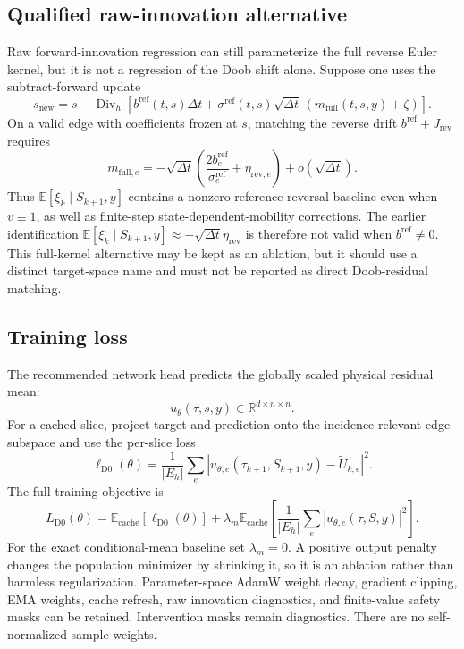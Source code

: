 \documentclass[11pt]{article}
\numberwithin{equation}{section}
\newcommand{\R}{\mathbb R}
\newcommand{\E}{\mathbb E}
\newcommand{\dive}{\operatorname{Div}_h}
\newcommand{\1}{\mathbf 1}
\begin{document}
\subsection{Qualified raw-innovation alternative}

Raw forward-innovation regression can still parameterize the full reverse Euler kernel, but it is not a regression of the Doob shift alone.  Suppose one uses the subtract-forward update
\begin{equation}\label{eq:subtract-forward-alternative-d0}
  s_{\mathrm{new}}=s-
  \dive\left[b^{\mathrm{ref}}(t,s)\Delta t
  +
  \sigma^{\mathrm{ref}}(t,s)\sqrt{\Delta t}\,(m_{\mathrm{full}}(t,s,y)+\zeta)\right].
\end{equation}
On a valid edge with coefficients frozen at \(s\), matching the reverse drift \(b^{\mathrm{ref}}+J_{\mathrm{rev}}\) requires
\begin{equation}\label{eq:full-innovation-mean-d0}
  m_{\mathrm{full},e}
  =-\sqrt{\Delta t}\left(
  \frac{2b_e^{\mathrm{ref}}}{\sigma_e^{\mathrm{ref}}}
  +\eta_{\mathrm{rev},e}\right)+o(\sqrt{\Delta t}).
\end{equation}
Thus \(\E[\xi_k\mid S_{k+1},y]\) contains a nonzero reference-reversal baseline even when \(v\equiv1\), as well as finite-step state-dependent-mobility corrections.  The earlier identification \(\E[\xi_k\mid S_{k+1},y]\approx-\sqrt{\Delta t}\eta_{\mathrm{rev}}\) is therefore not valid when \(b^{\mathrm{ref}}\ne0\).  This full-kernel alternative may be kept as an ablation, but it should use a distinct target-space name and must not be reported as direct Doob-residual matching.

\subsection{Training loss}

The recommended network head predicts the globally scaled physical residual mean:
\[
  u_\theta(\tau,s,y)\in\R^{d\times n\times n}.
\]
For a cached slice, project target and prediction onto the incidence-relevant edge subspace and use the per-slice loss
\begin{equation}\label{eq:masked-d0-loss}
  \ell_{\mathrm{D0}}(\theta)=
  \frac{1}{|E_h|}\sum_e\left|u_{\theta,e}(\tau_{k+1},S_{k+1},y)-\widetilde U_{k,e}\right|^2.
\end{equation}
The full training objective is
\begin{equation}\label{eq:d0-training-objective}
  L_{\mathrm{D0}}(\theta)=\E_{\mathrm{cache}}[\ell_{\mathrm{D0}}(\theta)]
  +\lambda_m\E_{\mathrm{cache}}\left[
  \frac{1}{|E_h|}\sum_e|u_{\theta,e}(\tau,S,y)|^2
  \right].
\end{equation}
For the exact conditional-mean baseline set \(\lambda_m=0\).  A positive output penalty changes the population minimizer by shrinking it, so it is an ablation rather than harmless regularization.  Parameter-space AdamW weight decay, gradient clipping, EMA weights, cache refresh, raw innovation diagnostics, and finite-value safety masks can be retained.  Intervention masks remain diagnostics.  There are no self-normalized sample weights.
\end{document}
